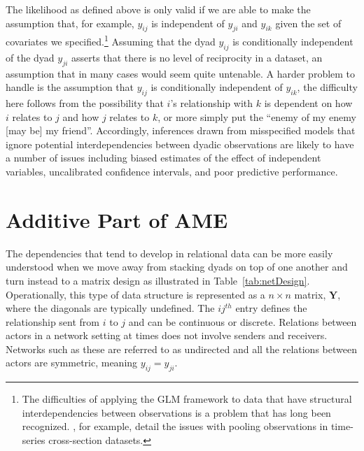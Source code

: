 \documentclass[12pt,pdflatex]{elsarticle}
\begin{document}
The likelihood as defined above is only valid if we are able to make the assumption that, for example, $y_{ij}$ is independent of $y_{ji}$ and $y_{ik}$ given the set of covariates we specified.\footnote{The difficulties of applying the GLM framework to data that have structural interdependencies between observations is a problem that has long been recognized. \citet{beck:katz:1995}, for example, detail the issues with pooling observations in time-series cross-section datasets.} Assuming that the dyad $y_{ij}$ is conditionally independent of the dyad $y_{ji}$ asserts that there is no level of reciprocity in a dataset, an assumption that in many cases would seem quite untenable. A harder problem to handle is the assumption that $y_{ij}$ is conditionally independent of $y_{ik}$, the difficulty here follows from the possibility that $i$'s relationship with $k$ is dependent on how $i$ relates to $j$ and how $j$ relates to $k$, or more simply put the ``enemy of my enemy [may be] my friend''. Accordingly, inferences drawn from misspecified models that ignore potential interdependencies between dyadic observations are likely to have a number of issues including biased estimates of the effect of independent variables, uncalibrated confidence intervals, and poor predictive performance.

\section*{\textbf{Additive Part of AME}}

The dependencies that tend to develop in relational data can be more easily understood when we move away from stacking dyads on top of one another and turn instead to a matrix design as illustrated in Table~\ref{tab:netDesign}. Operationally, this type of data structure is represented as a $n \times n$ matrix, $\mathbf{Y}$, where the diagonals are typically undefined. The $ij^{th}$ entry defines the relationship sent from $i$ to $j$ and can be continuous or discrete. Relations between actors in a network setting at times does not involve senders and receivers. Networks such as these are referred to as undirected and all the relations between actors are symmetric, meaning $y_{ij}=y_{ji}$.
\end{document}
